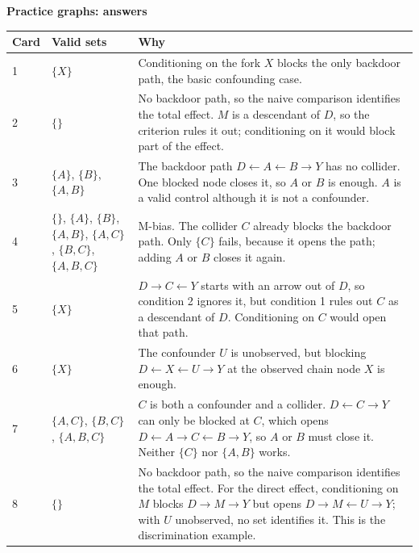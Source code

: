 \documentclass[10pt]{article}
\begin{document}
\newpage
{\LARGE\bfseries Practice graphs: answers}\par
\vspace{6pt}
\small
\begin{tabularx}{\textwidth}{@{}l>{\raggedright\arraybackslash}p{3.3cm}X@{}}
\toprule
Card & Valid sets & Why \\
\midrule
1 & $\{X\}$ & Conditioning on the fork $X$ blocks the only backdoor path, the basic confounding case. \\
2 & $\{\}$ & No backdoor path, so the naive comparison identifies the total effect. $M$ is a descendant of $D$, so the criterion rules it out; conditioning on it would block part of the effect. \\
3 & $\{A\}$, $\{B\}$, $\{A, B\}$ & The backdoor path $D \leftarrow A \leftarrow B \to Y$ has no collider. One blocked node closes it, so $A$ or $B$ is enough. $A$ is a valid control although it is not a confounder. \\
4 & $\{\}$, $\{A\}$, $\{B\}$, $\{A, B\}$, $\{A, C\}$, $\{B, C\}$, $\{A, B, C\}$ & M-bias. The collider $C$ already blocks the backdoor path. Only $\{C\}$ fails, because it opens the path; adding $A$ or $B$ closes it again. \\
5 & $\{X\}$ & $D \to C \leftarrow Y$ starts with an arrow out of $D$, so condition 2 ignores it, but condition 1 rules out $C$ as a descendant of $D$. Conditioning on $C$ would open that path. \\
6 & $\{X\}$ & The confounder $U$ is unobserved, but blocking $D \leftarrow X \leftarrow U \to Y$ at the observed chain node $X$ is enough. \\
7 & $\{A, C\}$, $\{B, C\}$, $\{A, B, C\}$ & $C$ is both a confounder and a collider. $D \leftarrow C \to Y$ can only be blocked at $C$, which opens $D \leftarrow A \to C \leftarrow B \to Y$, so $A$ or $B$ must close it. Neither $\{C\}$ nor $\{A, B\}$ works. \\
8 & $\{\}$ & No backdoor path, so the naive comparison identifies the total effect. For the direct effect, conditioning on $M$ blocks $D \to M \to Y$ but opens $D \to M \leftarrow U \to Y$; with $U$ unobserved, no set identifies it. This is the discrimination example. \\
\bottomrule
\end{tabularx}
\end{document}
